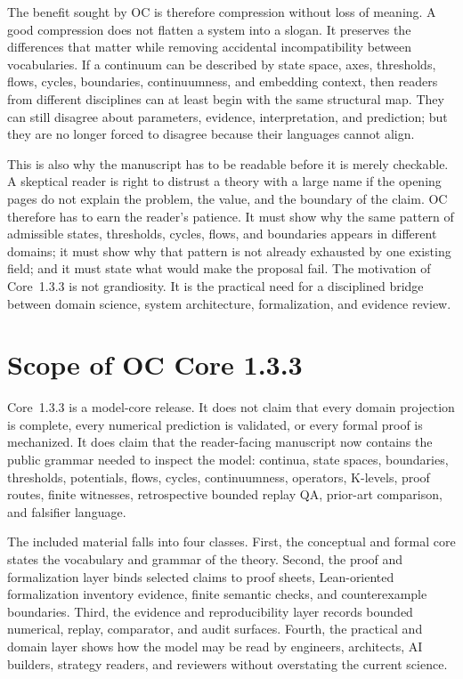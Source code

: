 The benefit sought by OC is therefore compression without loss of meaning. A
good compression does not flatten a system into a slogan. It preserves the
differences that matter while removing accidental incompatibility between
vocabularies. If a continuum can be described by state space, axes, thresholds,
flows, cycles, boundaries, continuumness, and embedding context, then readers
from different disciplines can at least begin with the same structural map.
They can still disagree about parameters, evidence, interpretation, and
prediction; but they are no longer forced to disagree because their languages
cannot align.

This is also why the manuscript has to be readable before it is merely
checkable. A skeptical reader is right to distrust a theory with a large name if
the opening pages do not explain the problem, the value, and the boundary of
the claim. OC therefore has to earn the reader's patience. It must show why the
same pattern of admissible states, thresholds, cycles, flows, and boundaries
appears in different domains; it must show why that pattern is not already
exhausted by one existing field; and it must state what would make the proposal
fail. The motivation of Core~1.3.3 is not grandiosity. It is the practical need
for a disciplined bridge between domain science, system architecture,
formalization, and evidence review.

\section{Scope of OC Core 1.3.3}
\label{sec:r008-scope}

Core~1.3.3 is a model-core release. It does not claim that every domain
projection is complete, every numerical prediction is validated, or every
formal proof is mechanized. It does claim that the reader-facing manuscript now
contains the public grammar needed to inspect the model: continua, state
spaces, boundaries, thresholds, potentials, flows, cycles, continuumness,
operators, K-levels, proof routes, finite witnesses, retrospective bounded replay QA,
prior-art comparison, and falsifier language.

The included material falls into four classes. First, the conceptual and formal
core states the vocabulary and grammar of the theory. Second, the proof and
formalization layer binds selected claims to proof sheets, Lean-oriented formalization inventory evidence,
finite semantic checks, and counterexample boundaries. Third, the evidence and
reproducibility layer records bounded numerical, replay, comparator, and audit
surfaces. Fourth, the practical and domain layer shows how the model may be read
by engineers, architects, AI builders, strategy readers, and reviewers without
overstating the current science.

